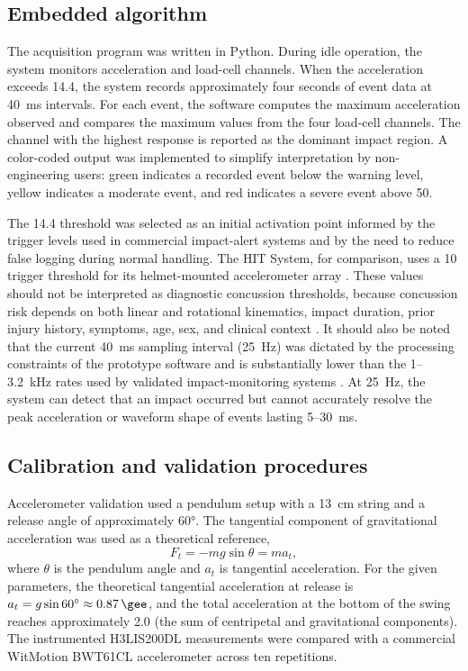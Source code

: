 \documentclass[11pt]{article}
\begin{document}
\subsection{Embedded algorithm}
The acquisition program was written in Python. During idle operation, the system monitors acceleration and load-cell channels. When the acceleration exceeds \SI{14.4}{\gee}, the system records approximately four seconds of event data at \SI{40}{ms} intervals. For each event, the software computes the maximum acceleration observed and compares the maximum values from the four load-cell channels. The channel with the highest response is reported as the dominant impact region. A color-coded output was implemented to simplify interpretation by non-engineering users: green indicates a recorded event below the warning level, yellow indicates a moderate event, and red indicates a severe event above \SI{50}{\gee}.

The \SI{14.4}{\gee} threshold was selected as an initial activation point informed by the trigger levels used in commercial impact-alert systems \citep{king2017systematic} and by the need to reduce false logging during normal handling. The HIT System, for comparison, uses a \SI{10}{\gee} trigger threshold for its helmet-mounted accelerometer array \citep{guskiewicz2007measurement}. These values should not be interpreted as diagnostic concussion thresholds, because concussion risk depends on both linear and rotational kinematics, impact duration, prior injury history, symptoms, age, sex, and clinical context \citep{patricios2023consensus,rowson2013brain,cecchi2023rotational}. It should also be noted that the current \SI{40}{ms} sampling interval (\SI{25}{Hz}) was dictated by the processing constraints of the prototype software and is substantially lower than the \SI{1}{}--\SI{3.2}{kHz} rates used by validated impact-monitoring systems \citep{king2017systematic,gabler2020onfield}. At \SI{25}{Hz}, the system can detect that an impact occurred but cannot accurately resolve the peak acceleration or waveform shape of events lasting \SI{5}{}--\SI{30}{ms}.

\subsection{Calibration and validation procedures}
Accelerometer validation used a pendulum setup with a \SI{13}{cm} string and a release angle of approximately \ang{60}. The tangential component of gravitational acceleration was used as a theoretical reference,
\begin{equation}
F_t = -m g\sin\theta = m a_t,
\end{equation}
where $\theta$ is the pendulum angle and $a_t$ is tangential acceleration. For the given parameters, the theoretical tangential acceleration at release is $a_t = g\sin 60^{\circ} \approx \SI{0.87}{\gee}$, and the total acceleration at the bottom of the swing reaches approximately \SI{2.0}{\gee} (the sum of centripetal and gravitational components). The instrumented H3LIS200DL measurements were compared with a commercial WitMotion BWT61CL accelerometer across ten repetitions.
\end{document}
